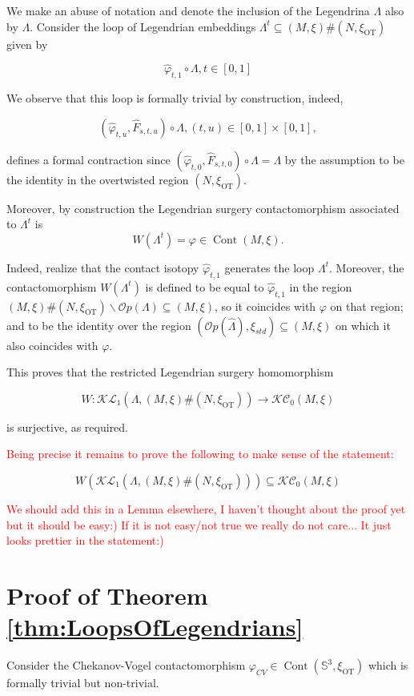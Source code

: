 \documentclass[11pt]{amsart}
\theoremstyle{plain}
\theoremstyle{definition}
\theoremstyle{remark}
\numberwithin{theorem}{section}
\newcommand{\NS}{{\mathbb{S}}}
\newcommand{\Op}{{\mathcal{O}p}}
\newcommand{\KL}{\mathcal{KL}}
\newcommand{\KC}{\mathcal{KC}}
\newcommand{\Cont}{\operatorname{Cont}}
\newcommand{\OT}{\operatorname{OT}}
\begin{document}
We  make an abuse of notation and denote the inclusion of the Legendrina $\Lambda$ also by $\Lambda$. Consider the loop of Legendrian embeddings $\Lambda^t\subseteq (M,\xi)\#(N,\xi_{\OT})$ given by 

$$  \hat{\varphi}_{t,1}\circ \Lambda, t\in[0,1]  $$

We observe that this loop is formally trivial by construction, indeed, 

$$ (\hat{\varphi}_{t,u},\hat{F}_{s,t,u})\circ \Lambda, (t,u)\in[0,1]\times[0,1], $$

defines a formal contraction since $(\hat{\varphi}_{t,0},\hat{F}_{s,t,0})\circ \Lambda=\Lambda$ by the assumption to be the identity in the overtwisted region $(N,\xi_{\OT})$.

Moreover, by construction the Legendrian surgery contactomorphism associated to $\Lambda^t$ is 
$$ W(\Lambda^t)=\varphi\in \Cont(M,\xi). $$

Indeed, realize that the contact isotopy $\hat{\varphi}_{t,1}$ generates the loop $\Lambda^t$. Moreover, the contactomorphism $W(\Lambda^t)$ is defined to be equal to $\hat{\varphi}_{t,1}$ in the region $(M,\xi)\#(N,\xi_{\OT})\backslash \Op(\Lambda)\subseteq (M,\xi)$, so it coincides with $\varphi$ on that region; and to be the identity over the region $(\Op(\hat{\Lambda}),\xi_{std})\subseteq (M,\xi)$ on which it also coincides with $\varphi$.

This proves that the restricted Legendrian surgery homomorphism 

$$ W: \KL_1(\Lambda, (M,\xi)\#(N,\xi_{\OT}))\rightarrow \KC_0(M,\xi) $$

is surjective, as required. 

\textcolor{red}{Being precise it remains to prove the following to make sense of the statement:}

$$ W( \KL_1(\Lambda, (M,\xi)\#(N,\xi_{\OT})) ) \subseteq \KC_0(M,\xi) $$

\textcolor{red}{We should add this in a Lemma elsewhere, I haven't thought about the proof yet but it should be easy:) If it is not easy/not true we really do not care... It just looks prettier in the statement:)}

\section{Proof of Theorem \ref{thm:LoopsOfLegendrians}}

Consider the Chekanov-Vogel contactomorphism $\varphi_{CV}\in \Cont(\NS^3,\xi_{\OT})$ which is formally trivial but non-trivial. 
\end{document}
